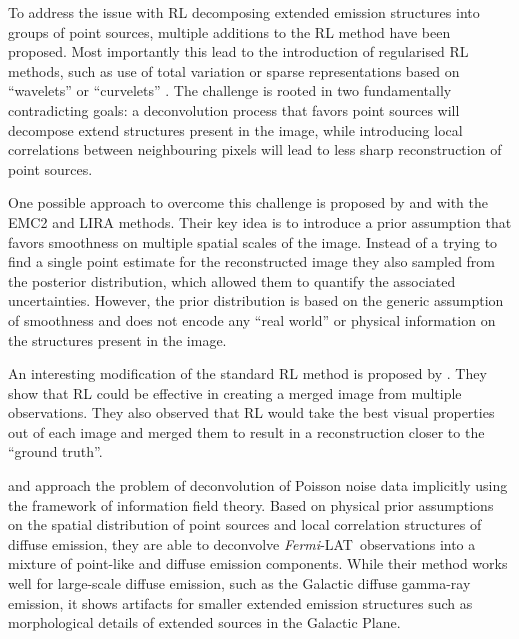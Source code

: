\documentclass[twocolumn]{aastex631}
\newcommand{\fermi}{\textit{Fermi}-LAT~}
\begin{document}
    To address the issue with RL decomposing extended emission structures into groups of point sources, multiple additions to the RL method  have been proposed. Most importantly this lead to the introduction of regularised RL methods, such as use of total variation \citep{Dey2006} or sparse representations based on \enquote{wavelets} or \enquote{curvelets} \citep{Starck2003}. The challenge is rooted in two fundamentally contradicting goals: a deconvolution process that favors point sources will decompose extend structures present in the image, while introducing local correlations between neighbouring pixels will lead to less sharp reconstruction of point sources.

    One possible approach to overcome this challenge is proposed by \cite{Esch2004} and \cite{Connors2011} with the EMC2 and LIRA methods. Their key idea is to introduce a prior assumption that favors smoothness on multiple spatial scales of the image. Instead of a trying to find a single point estimate for the reconstructed image they also sampled from the posterior distribution, which allowed them to quantify the associated uncertainties. However, the prior distribution is based on the generic assumption of smoothness and does not encode any \enquote{real world} or physical information on the structures present in the image.

    An interesting modification of the standard RL method is proposed by \cite{Ingaramo2014}. They show that RL could be effective in creating a merged image from multiple observations. They also observed that RL would take the best visual properties out of each image and merged them to result in a reconstruction closer to the \enquote{ground truth}.
    
    \cite{Selig2015} and \cite{Pumpe2018} approach the problem of deconvolution of Poisson noise data implicitly using the framework of information field theory. Based on physical prior assumptions on the spatial distribution of point sources and local correlation structures of diffuse emission, they are able to deconvolve \fermi observations
    into a mixture of point-like and diffuse emission components. While their method works well for large-scale diffuse emission, such as the Galactic diffuse gamma-ray emission, it shows artifacts for smaller extended emission structures such as morphological details of extended sources in the Galactic Plane.
    
\end{document}
